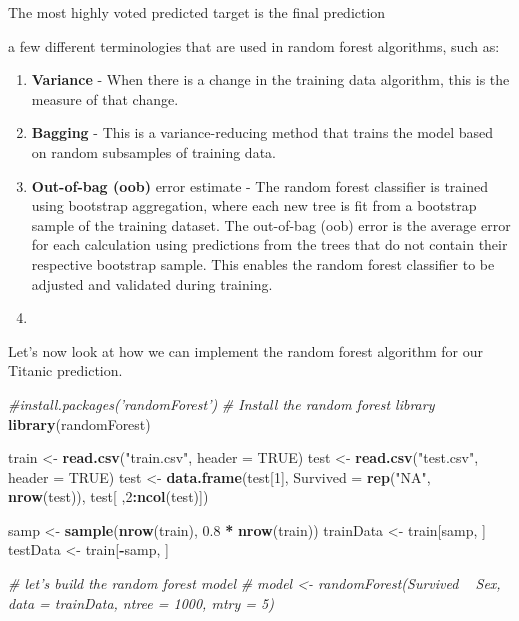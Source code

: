 \documentclass[
]{book}
\newenvironment{Shaded}{\begin{snugshade}}{\end{snugshade}}
\newcommand{\CommentTok}[1]{\textcolor[rgb]{0.56,0.35,0.01}{\textit{#1}}}
\newcommand{\DataTypeTok}[1]{\textcolor[rgb]{0.13,0.29,0.53}{#1}}
\newcommand{\DecValTok}[1]{\textcolor[rgb]{0.00,0.00,0.81}{#1}}
\newcommand{\FloatTok}[1]{\textcolor[rgb]{0.00,0.00,0.81}{#1}}
\newcommand{\KeywordTok}[1]{\textcolor[rgb]{0.13,0.29,0.53}{\textbf{#1}}}
\newcommand{\NormalTok}[1]{#1}
\newcommand{\OperatorTok}[1]{\textcolor[rgb]{0.81,0.36,0.00}{\textbf{#1}}}
\newcommand{\OtherTok}[1]{\textcolor[rgb]{0.56,0.35,0.01}{#1}}
\newcommand{\StringTok}[1]{\textcolor[rgb]{0.31,0.60,0.02}{#1}}
\begin{document}
The most highly voted predicted target is the final prediction

a few different terminologies that are used in random forest algorithms, such as:

\begin{enumerate}
\def\labelenumi{\arabic{enumi}.}
\item
  \textbf{Variance} - When there is a change in the training data algorithm, this is the measure of that change.
\item
  \textbf{Bagging} - This is a variance-reducing method that trains the model based on random subsamples of training data.
\item
  \textbf{Out-of-bag (oob)} error estimate - The random forest classifier is trained using bootstrap aggregation, where each new tree is fit from a bootstrap sample of the training dataset. The out-of-bag (oob) error is the average error for each calculation using predictions from the trees that do not contain their respective bootstrap sample. This enables the random forest classifier to be adjusted and validated during training.
\item
\end{enumerate}

Let's now look at how we can implement the random forest algorithm for our Titanic prediction.

\begin{Shaded}
\begin{Highlighting}[]
\CommentTok{#install.packages('randomForest')}
\CommentTok{# Install the random forest library}
\KeywordTok{library}\NormalTok{(randomForest) }

\NormalTok{train <-}\StringTok{ }\KeywordTok{read.csv}\NormalTok{(}\StringTok{"train.csv"}\NormalTok{, }\DataTypeTok{header =} \OtherTok{TRUE}\NormalTok{)}
\NormalTok{test <-}\StringTok{ }\KeywordTok{read.csv}\NormalTok{(}\StringTok{"test.csv"}\NormalTok{, }\DataTypeTok{header =} \OtherTok{TRUE}\NormalTok{)}
\NormalTok{test <-}\StringTok{ }\KeywordTok{data.frame}\NormalTok{(test[}\DecValTok{1}\NormalTok{], }\DataTypeTok{Survived =} \KeywordTok{rep}\NormalTok{(}\StringTok{"NA"}\NormalTok{, }\KeywordTok{nrow}\NormalTok{(test)), test[ ,}\DecValTok{2}\OperatorTok{:}\KeywordTok{ncol}\NormalTok{(test)])}

\NormalTok{samp <-}\StringTok{ }\KeywordTok{sample}\NormalTok{(}\KeywordTok{nrow}\NormalTok{(train), }\FloatTok{0.8} \OperatorTok{*}\StringTok{ }\KeywordTok{nrow}\NormalTok{(train))}
\NormalTok{trainData <-}\StringTok{ }\NormalTok{train[samp, ]}
\NormalTok{testData <-}\StringTok{ }\NormalTok{train[}\OperatorTok{-}\NormalTok{samp, ]}


\CommentTok{# let’s build the random forest model}
\CommentTok{# model <- randomForest(Survived ~ Sex, data = trainData, ntree = 1000, mtry = 5)}
\end{Highlighting}
\end{Shaded}
\end{document}
